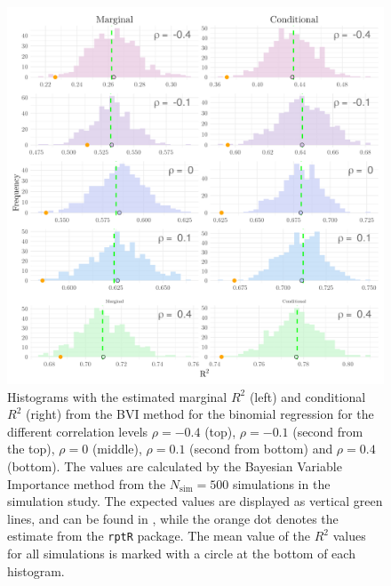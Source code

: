 \begin{figure}[H]
  \centering
  \includegraphics[width=1.1\linewidth]{Figures/Simulation study/R2_combined_logit.png}
  \caption[Marginal and conditional $R^2$ in Binomial GLMM]{Histograms with the estimated marginal $R^2$ (left) and conditional $R^2$ (right) from the BVI method for the binomial regression for the different correlation levels $\rho=-0.4$ (top), $\rho=-0.1$ (second from the top), $\rho=0$ (middle), $\rho=0.1$ (second from bottom) and $\rho=0.4$ (bottom). The values are calculated by the Bayesian Variable Importance method from the $N_{\text{sim}}=500$ simulations in the simulation study. The expected values are displayed as vertical green lines, and can be found in , while the orange dot denotes the estimate from the \texttt{rptR} package. The mean value of the $R^2$ values for all simulations is marked with a circle at the bottom of each histogram.}
  \label{fig:r2_combined_logit}
\end{figure}






